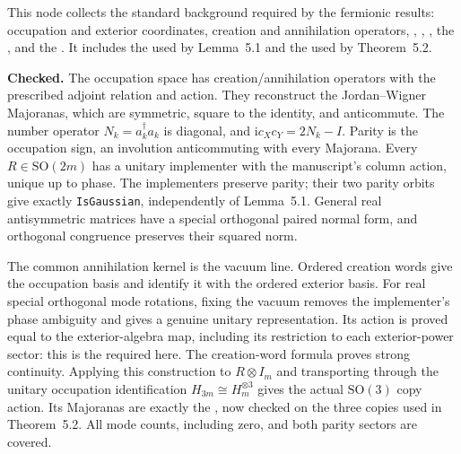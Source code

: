 \begin{lemma}
  \leanok
  \par
  This node collects the standard background required by the fermionic results:
  occupation and exterior coordinates, creation and annihilation operators,
  ,
  ,
  , the
  , and the
  .
  It includes the  used by Lemma~5.1 and the
   used by Theorem~5.2.

  \textbf{Checked.} The occupation space has creation/annihilation operators
  with the prescribed adjoint relation and action. They reconstruct the
  Jordan--Wigner Majoranas, which are symmetric, square to the identity,
  and anticommute. The number operator $N_k=a_k^\dagger a_k$ is diagonal,
  and $\mathrm{i}c_Xc_Y=2N_k-I$. Parity is the occupation sign, an involution
  anticommuting with every Majorana. Every $R\in\mathrm{SO}(2m)$ has a unitary
  implementer with the manuscript's column action, unique up to phase.
  The implementers preserve parity; their two parity orbits give exactly
  \texttt{IsGaussian}, independently of Lemma~5.1.
  General real antisymmetric matrices have a special orthogonal paired
  normal form, and orthogonal congruence preserves their squared norm.

  The common annihilation kernel is the vacuum line. Ordered creation words
  give the occupation basis and identify it with the ordered exterior basis.
  For real special orthogonal mode rotations, fixing the vacuum removes the
  implementer's phase ambiguity and gives a genuine unitary representation.
  Its action is proved equal to the exterior-algebra map, including its
  restriction to each exterior-power sector: this is the
   required here.
  The creation-word formula proves strong continuity.
  Applying this construction to $R\otimes I_m$ and transporting through the
  unitary occupation identification $H_{3m}\cong H_m^{\otimes3}$ gives the
  actual $\mathrm{SO}(3)$ copy action. Its Majoranas are exactly the
  , now checked
  on the three copies used in Theorem~5.2. All mode counts, including zero,
  and both parity sectors are covered.


\end{lemma}
